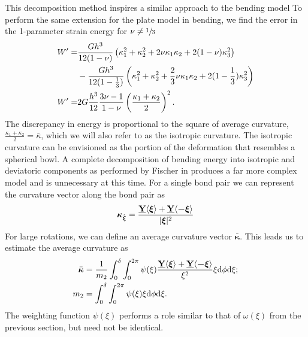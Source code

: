 \documentclass[preprint,review,12pt]{elsarticle}
\newcommand\vstate[3]{%
	\mathbf{\underline{#1}}%
	\ifstrempty{#2}{}{[#2]}%
	\ifstrempty{#3}{}{\langle #3 \rangle}}
\begin{document}
This decomposition method inspires a similar approach to the bending model
To perform the same extension for the plate model in bending, we find the error in the 1-parameter strain energy for \(\nu \neq \sfrac{1}{3}\)
%
\begin{align}
    W'=&\frac{G h^3}{12(1-\nu)} \left(\kappa_1^2+\kappa_2^2+2\nu\kappa_1\kappa_2+2(1-\nu)\kappa_3^2 \right)\notag\\
    &-\frac{G h^3}{12(1-\frac{1}{3})} \left(\kappa_1^2+\kappa_2^2+\frac{2}{3}\nu\kappa_1\kappa_2+2(1-\frac{1}{3})\kappa_3^2 \right) \notag \\
    W'=&2G \frac{h^3}{12}\frac{3\nu-1}{1-\nu} \left(\frac{\kappa_1+\kappa_2}{2}\right)^2.\notag
\end{align}
%
The discrepancy in energy is proportional to the square of average curvature, \(\frac{\kappa_1+\kappa_2}{2} = \bar{\kappa}\), which we will also refer to as the isotropic curvature.
The isotropic curvature can be envisioned as the portion of the deformation that resembles a spherical bowl.
A complete decomposition of bending energy into isotropic and deviatoric components as performed by Fischer in \cite{fischer1992bending} produces a far more complex model and is unnecessary at this time.
For a single bond pair we can represent the curvature vector along the bond pair as 
%
\begin{equation}
    \boldsymbol{\kappa} _{\hat{\boldsymbol{\xi}}} = \frac{\vstate{Y}{}{\boldsymbol{\xi}}+\vstate{Y}{}{\boldsymbol{-\xi}}}{|\boldsymbol{\xi}|^2}\notag
\end{equation}
%
%
For large rotations, we can define an average curvature vector \(\bar{\boldsymbol{\kappa}}\).
This leads us to estimate the average curvature as 
%
\begin{align}
    \bar{\boldsymbol{\kappa}} &= \frac{1}{m_2} \int_0^\delta \int_0^{2\pi}\psi(\xi)\frac{\vstate{Y}{}{\boldsymbol{\xi}}+\vstate{Y}{}{\boldsymbol{-\xi}}}{\xi^2} \xi {\rm d}\phi {\rm d}\xi ;\notag \\
    m_2 &= \int_0^\delta \int_0^{2\pi}\psi(\xi)\xi {\rm d}\phi {\rm d}\xi. \notag
\end{align}
%
The weighting function \(\psi(\xi)\) performs a role similar to that of \(\omega(\xi)\) from the previous section, but need not be identical.
\end{document}
